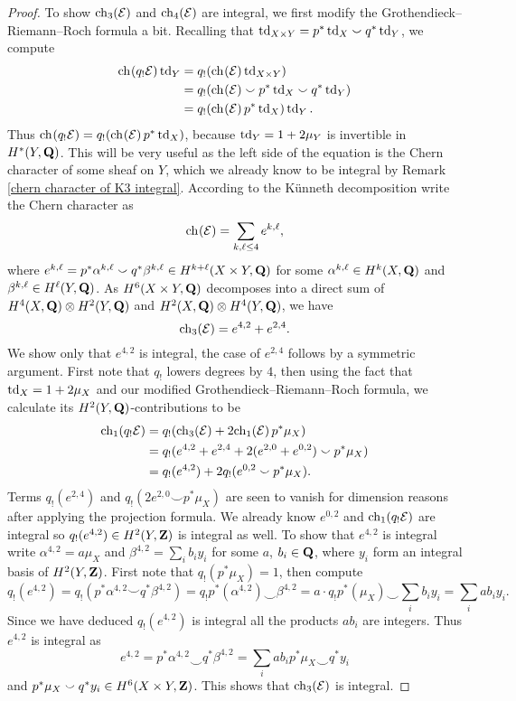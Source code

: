 \begin{proof}
    To show $\ch[3]{\E}$ and $\ch[4]{\E}$ are integral, we first modify the Grothendieck--Riemann--Roch formula a bit. Recalling that $\operatorname{td}_{X \times Y} = p^*\operatorname{td}_{X} \smallsmile q^*\operatorname{td}_{Y}$, we compute
    \begin{align*}
        \ch[]{q_!\E}\tdclass{Y} &= q_!(\ch[]{\E}\tdclass{X \times Y}) \\
        &= q_!(\ch[]{\E} \smallsmile p^*\tdclass{X} \smallsmile q^*\tdclass{Y}) \\
        &= q_!(\ch[]{\E}p^*\tdclass{X})\tdclass{Y}.  
    \end{align*} 
    Thus $\ch[]{q_!\E} = q_!(\ch[]{\E}p^*\tdclass{X})$, because $\operatorname{td}_{Y} = 1 + 2\mu_Y$ is invertible in $H^{*}(Y, \mathbf Q)$. This will be very useful as the left side of the equation is the Chern character of some sheaf on $Y$, which we already know to be integral by Remark \ref{chern character of K3 integral}. According to the Künneth decomposition write the Chern character as 
    \[
        \ch[]{\E} = \sum_{k,\ell \leq 4} e^{k,\ell},
    \]
    where $e^{k,\ell} = p^* \alpha^{k,\ell} \smallsmile q^*\beta^{k, \ell} \in H^{k+\ell}(X \times Y, \mathbf Q)$ for some $\alpha^{k,\ell} \in H^{k}(X, \mathbf Q)$ and $\beta^{k, \ell} \in H^{\ell}(Y, \mathbf Q)$. As $H^{6}(X \times Y, \mathbf Q)$ decomposes into a direct sum of $H^4(X, \mathbf Q) \otimes H^2(Y, \mathbf Q)$ and $H^2(X, \mathbf Q) \otimes H^4(Y, \mathbf Q)$, we have
    \[
        \ch[3]{\E} = e^{4,2} + e^{2,4}.
    \]
    We show only that $e^{4,2}$ is integral, the case of $e^{2,4}$ follows by a symmetric argument. First note that $q_!$ lowers degrees by $4$, then using the fact that $\operatorname{td}_{X} = 1 + 2\mu_X$ and our modified Grothendieck--Riemann--Roch formula, we calculate its $H^2(Y, \mathbf Q)$-contributions to be
    \begin{align*}
        \ch[1]{q_!\E} &= q_!(\ch[3]{\E} + 2\ch[1]{\E}p^*\mu_X) \\
        &= q_!(e^{4,2} + e^{2,4} + 2(e^{2,0} + e^{0,2}) \smallsmile p^*\mu_X) \\
        &= q_!(e^{4,2}) + 2q_!(e^{0,2} \smallsmile p^*\mu_X).
    \end{align*}
    Terms $ q_!(e^{2,4})$ and $q_!(2e^{2,0} \smallsmile p^*\mu_X)$ are seen to vanish for dimension reasons after applying the projection formula. We already know $e^{0,2}$ and $\ch[1]{q_!\E}$ are integral so $q_!(e^{4,2}) \in H^{2}(Y, \mathbf Z)$ is integral as well. To show that $e^{4,2}$ is integral write $\alpha^{4,2} = a \mu_X$ and $\beta^{4,2} = \sum_i b_i y_i$ for some $a$, $b_i \in \mathbf Q$, where $y_i$ form an integral basis of $H^{2}(Y, \mathbf Z)$. First note that $q_!(p^*\mu_X) = 1$, then compute
    \[
        q_!(e^{4,2}) = q_!(p^*\alpha^{4,2} \smallsmile q^*\beta^{4,2}) = q_!p^*(\alpha^{4,2}) \smallsmile \beta^{4,2} = a \cdot q_!p^*(\mu_X) \smallsmile \sum_i b_i y_i = \sum_i ab_i y_i.
    \]
    Since we have deduced $q_!(e^{4,2})$ is integral all the products $ab_i$ are integers. Thus $e^{4,2}$ is integral as
    \[
        e^{4,2} = p^*\alpha^{4,2} \smallsmile q^*\beta^{4,2} = \sum_i ab_i p^*\mu_X \smallsmile q^*y_i
    \]
    and $p^*\mu_X \smallsmile q^*y_i \in H^{6}(X \times Y, \mathbf Z)$. This shows that $\ch[3]{\E}$ is integral.


\end{proof}

